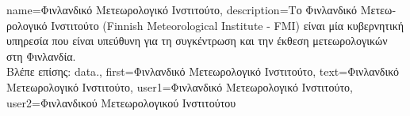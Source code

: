 {name={\foreignlanguage{greek}{Φινλανδικό Μετεωρολογικό Ινστιτούτο}}, 
	description={\foreignlanguage{greek}{Το Φινλανδικό Μετεωρολογικό Ινστιτούτο}
		(Finnish Meteorological Institute - FMI) 
		\foreignlanguage{greek}{είναι μία κυβερνητική υπηρεσία που είναι υπεύθυνη 
		για τη συγκέντρωση και την έκθεση μετεωρολογικών}  \foreignlanguage{greek}{στη Φινλανδία.} 
		\\
		\foreignlanguage{greek}{Βλέπε επίσης:} \gls{data}.},
	first={\foreignlanguage{greek}{Φινλανδικό Μετεωρολογικό Ινστιτούτο}},
	text={\foreignlanguage{greek}{Φινλανδικό Μετεωρολογικό Ινστιτούτο}},
	user1={\foreignlanguage{greek}{Φινλανδικό Μετεωρολογικό Ινστιτούτο}}, %
	user2={\foreignlanguage{greek}{Φινλανδικού Μετεωρολογικού Ινστιτούτου}} %
}

